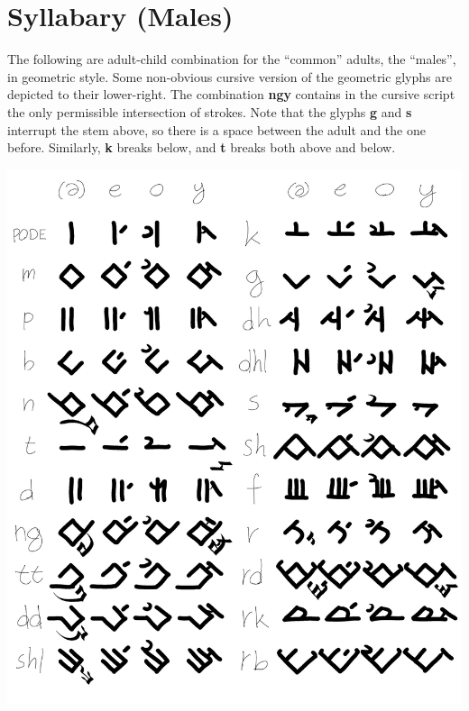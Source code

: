 \documentclass[10pt,oneside]{memoir}
\begin{document}
\section{Syllabary (Males)}
The following are adult-child combination for the ``common'' adults, the ``males'', in geometric style. Some non-obvious cursive version of the geometric glyphs are depicted to their lower-right. The combination \textbf{ngy} contains in the cursive script the only permissible intersection of strokes. Note that the glyphs \textbf{g} and \textbf{s} interrupt the stem above, so there is a space between the adult and the one before. Similarly, \textbf{k} breaks below, and \textbf{t} breaks both above and below.

\begin{center}
    \includegraphics[scale=0.60]{syllabary_males_small}
\end{center}


\end{document}
